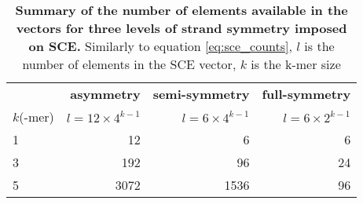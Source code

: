 \begin{table}[ht!]
\centering
\caption{\textbf{Summary of the number of elements available in the vectors for three levels of strand symmetry imposed on SCE.} Similarly to equation \ref{eq:sce_counts}, $l$ is the number of elements in the SCE vector, $k$ is the k-mer size}
\label{tab:sce_symmetric}
\begin{tabulary}{\textwidth}{ lrrr }
\toprule
 & \textbf{asymmetry} & \textbf{semi-symmetry} & \textbf{full-symmetry} \\
 $k$(-mer) & $l = 12 \times 4^{k-1}$ & $l = 6 \times 4^{k-1}$ & $l = 6 \times 2^{k-1}$ \\
\hline

1 & 12 & 6 & 6 \\
3 & 192 & 96 & 24 \\
5 & 3072 & 1536 & 96 \\

\bottomrule

\end{tabulary}
\end{table}
